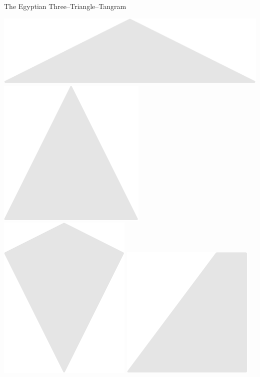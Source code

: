 \documentclass[14pt]{beamer}
\begin{document}
\begin{frame}{The Egyptian Three--Triangle--Tangram}
\begin{center}
            \bigskip\smallskip

            \includegraphics[scale=0.39]{figures/figure004d.pdf}\quad
            \includegraphics[scale=0.39]{figures/figure004c.pdf}
            \includegraphics[scale=0.39]{figures/figure004j.pdf}\!\!
            \includegraphics[scale=0.39]{figures/figure004g.pdf}\quad

\end{center}
\end{frame}
\end{document}
